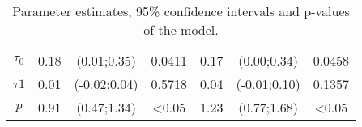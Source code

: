 \documentclass{article}
\begin{document}
\begin{table}[H]
\begin{tabular}{c|cccccc}
$\tau_0$                   & 0.18       & (0.01;0.35)                                                       & \multicolumn{1}{c|}{0.0411} & 0.17       & (0.00;0.34)                                                       & 0.0458           \\
$\tau1$                    & 0.01       & (-0.02;0.04)                                                      & \multicolumn{1}{c|}{0.5718}           & 0.04       & (-0.01;0.10)                                                      & 0.1357           \\
$p$                        & 0.91       & (0.47;1.34)                                                       & \multicolumn{1}{c|}{\textless 0.05} & 1.23       & (0.77;1.68)                                                       & \textless 0.05 \\ \hline
\end{tabular}
\caption{Parameter estimates, 95\% confidence intervals and p-values of the model.}
\label{tab3}
\end{table}

\end{document}
